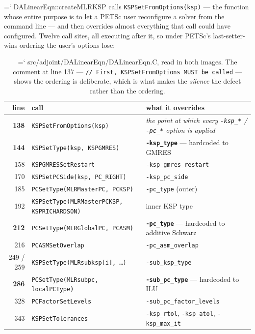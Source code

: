 \documentclass[11pt,a4paper]{article}
\newcommand{\artifact}[1]{{\small\ttfamily\hyphenchar\font=`\-\relax
  \def\_{\textunderscore\allowbreak}#1}}
\begin{document}
\artifact{DALinearEqn::createMLRKSP} calls \texttt{KSPSetFromOptions(ksp)} --- the function
whose entire purpose is to let a PETSc user reconfigure a solver from the command line --- and
then overrides almost everything that call could have configured. Twelve call sites, all
executing after it, so under PETSc's last-setter-wins ordering the user's options lose:

\begin{table}[htbp]
\centering\scriptsize
\begin{tabular}{@{}rL{5.9cm}L{6.1cm}@{}}
\toprule
line & call & what it overrides \\
\midrule
\textbf{138} & \texttt{KSPSetFromOptions(ksp)} & \emph{the point at which every \texttt{-ksp\_*} / \texttt{-pc\_*} option is applied} \\
\textbf{144} & \texttt{KSPSetType(ksp, KSPGMRES)} & \textbf{\texttt{-ksp\_type}} --- hardcoded to GMRES \\
158 & \texttt{KSPGMRESSetRestart} & \texttt{-ksp\_gmres\_restart} \\
170 & \texttt{KSPSetPCSide(ksp, PC\_RIGHT)} & \texttt{-ksp\_pc\_side} \\
185 & \texttt{PCSetType(MLRMasterPC, PCKSP)} & \texttt{-pc\_type} (outer) \\
192 & \texttt{KSPSetType(MLRMasterPCKSP, KSPRICHARDSON)} & inner KSP type \\
\textbf{212} & \texttt{PCSetType(MLRGlobalPC, PCASM)} & \textbf{\texttt{-pc\_type}} --- hardcoded to additive Schwarz \\
216 & \texttt{PCASMSetOverlap} & \texttt{-pc\_asm\_overlap} \\
249 / 259 & \texttt{KSPSetType(MLRsubksp[i], \ldots)} & \texttt{-sub\_ksp\_type} \\
\textbf{286} & \texttt{PCSetType(MLRsubpc, localPCType)} & \textbf{\texttt{-sub\_pc\_type}} --- hardcoded to ILU \\
328 & \texttt{PCFactorSetLevels} & \texttt{-sub\_pc\_factor\_levels} \\
343 & \texttt{KSPSetTolerances} & \texttt{-ksp\_rtol}, \texttt{-ksp\_atol}, \texttt{-ksp\_max\_it} \\
\bottomrule
\end{tabular}
\caption{\artifact{src/adjoint/DALinearEqn/DALinearEqn.C}, read in both images. The comment at
line 137 --- \texttt{// First, KSPSetFromOptions MUST be called} --- shows the ordering is
deliberate, which is what makes the \emph{silence} the defect rather than the ordering.}
\label{tab:kspsites}
\end{table}
\end{document}
